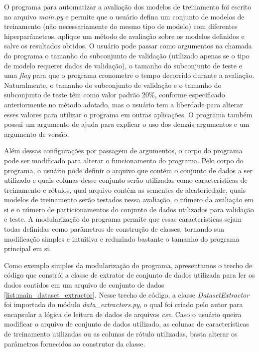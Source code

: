 O programa para automatizar a avaliação dos modelos de treinamento foi escrito no arquivo \textit{main.py} e permite que o usuário defina um conjunto de modelos de treinamento (não necessariamente do mesmo tipo de modelo) com diferentes hiperparâmetros, aplique um método de avaliação sobre os modelos definidos e salve os resultados obtidos. O usuário pode passar como argumentos na chamada do programa o tamanho do subconjunto de validação (utilizado apenas se o tipo de modelo requerer dados de validação), o tamanho do subconjunto de teste e uma \textit{flag} para que o programa cronometre o tempo decorrido durante a avaliação. Naturalmente, o tamanho do subconjunto de validação e o tamanho do subconjunto de teste têm como valor padrão 20\%, conforme especificado anteriormente no método adotado, mas o usuário tem a liberdade para alterar esses valores para utilizar o programa em outras aplicações. O programa também possui um argumento de ajuda para explicar o uso dos demais argumentos e um argumento de versão.

Além dessas configurações por passagem de argumentos, o corpo do programa pode ser modificado para alterar o funcionamento do programa. Pelo corpo do programa, o usuário pode definir o arquivo que contém o conjunto de dados a ser utilizado e quais colunas desse conjunto serão utilizadas como características de treinamento e rótulos, qual arquivo contém as sementes de aleatoriedade, quais modelos de treinamento serão testados nessa avaliação, o número da avaliação em si e o número de particionamentos do conjunto de dados utilizados para validação e teste. A modularização do programa permite que essas características sejam todas definidas como parâmetros de construção de classes, tornando sua modificação simples e intuitiva e reduzindo bastante o tamanho do programa principal em si.

Como exemplo simples da modularização do programa, apresentamos o trecho de código que constrói a classe de extrator de conjunto de dados utilizada para ler os dados contidos em um arquivo de conjunto de dados \ref{list:main_dataset_extractor}. Nesse trecho de código, a classe \textit{DatasetExtractor} foi importada do módulo \textit{data\_extractors.py}, o qual foi criado pelo autor para encapsular a lógica de leitura de dados de arquivos \textit{csv}. Caso o usuário queira modificar o arquivo de conjunto de dados utilizado, as colunas de características de treinamento utilizadas ou as colunas de rótulo utilizadas, basta alterar os parâmetros fornecidos ao construtor da classe.

